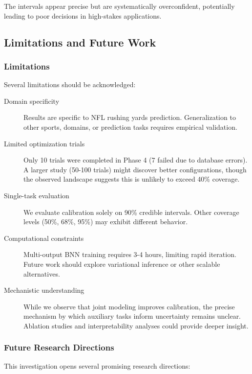 The intervals appear precise but are systematically overconfident, potentially leading to poor decisions in high-stakes applications.

\subsection{Limitations and Future Work}
\label{subsec:limitations}

\subsubsection{Limitations}

Several limitations should be acknowledged:

\begin{description}
    \item[Domain specificity] Results are specific to NFL rushing yards prediction. Generalization to other sports, domains, or prediction tasks requires empirical validation.

    \item[Limited optimization trials] Only 10 trials were completed in Phase 4 (7 failed due to database errors). A larger study (50-100 trials) might discover better configurations, though the observed landscape suggests this is unlikely to exceed 40\% coverage.

    \item[Single-task evaluation] We evaluate calibration solely on 90\% credible intervals. Other coverage levels (50\%, 68\%, 95\%) may exhibit different behavior.

    \item[Computational constraints] Multi-output BNN training requires 3-4 hours, limiting rapid iteration. Future work should explore variational inference or other scalable alternatives.

    \item[Mechanistic understanding] While we observe that joint modeling improves calibration, the precise mechanism by which auxiliary tasks inform uncertainty remains unclear. Ablation studies and interpretability analyses could provide deeper insight.
\end{description}

\subsubsection{Future Research Directions}

This investigation opens several promising research directions:

